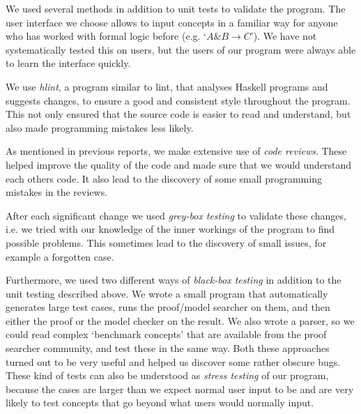 We used several methods in addition to unit tests to validate the program.
The user interface we choose allows to input concepts in a familiar way for anyone
who has worked with formal logic before (e.g. `$A \& B \rightarrow C$'). We have not systematically
tested this on users, but the users of our program were always able to learn the interface quickly.

We use \emph{hlint}, a program similar to lint, that analyses Haskell programs and
suggests changes, to ensure a good and consistent style throughout the program. This
not only ensured that the source code is easier to read and understand, but also
made programming mistakes less likely.

As mentioned in previous reports, we make extensive use of \emph{code reviews}. These
helped improve the quality of the code and made sure that we would understand
each others code. It also lead to the discovery of some small programming mistakes
in the reviews.

After each significant change we used \emph{grey-box testing} to validate these
changes, i.e. we tried with our knowledge of the inner workings of the program
to find possible problems. This sometimes lead to the discovery of small issues,
for example a forgotten case.

Furthermore, we used two different ways of \emph{black-box testing} in addition to
the unit testing described above. We wrote a small program that automatically generates
large test cases, runs the proof/model searcher on them, and then either the proof
or the model checker on the result. We also wrote a parser, so we could read complex
`benchmark concepts' that are available from the proof searcher community, and
test these in the same way. Both these approaches turned out to be very
useful and helped us discover some rather obscure bugs.
These kind of tests can also be understood as \emph{stress testing} of our
program, because the cases are larger than we expect normal user input to be
and are very likely to test concepts that go beyond what users would normally
input.